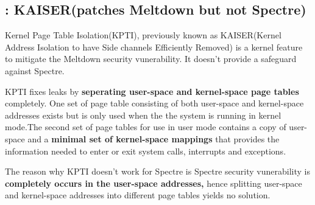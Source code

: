 \documentclass[12pt]{article}
\begin{document}
\begin{appendices}
\section{: KAISER(patches Meltdown but not Spectre)}

Kernel Page Table Isolation(KPTI), previously known as KAISER(Kernel Address Isolation to have Side channels Efficiently Removed) is a kernel feature to mitigate the Meltdown security vunerability. It doesn't provide a safeguard against Spectre.

KPTI fixes leaks by \textbf{seperating user-space and kernel-space page tables} completely. One set of page table consisting of both user-space and kernel-space addresses exists but is only used when the the system is running in kernel mode.The second set of page tables for use in user mode contains a copy of user-space and a \textbf{minimal set of kernel-space mappings} that provides the information needed to enter or exit system calls, interrupts and exceptions.

The reason why KPTI doesn't work for Spectre is Spectre security vunerability is \textbf{completely occurs in the user-space addresses,} hence splitting user-space and kernel-space addresses into different page tables yields no solution.

   
	
\end{appendices}
\end{document}
